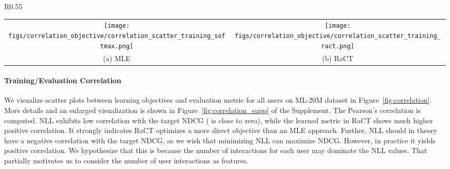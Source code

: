 \documentclass{article} \usepackage{iclr2020_conference,times}
\begin{document}
\begin{wrapfigure}{R}{0.55\textwidth}
\vspace{-0mm}
	\centering
	\begin{tabular}{c c}
		\hspace{-4mm}
		\texttt{[image: figs/correlation\_objective/correlation\_scatter\_training\_softmax.png]} &
		\hspace{-7mm}
		\texttt{[image: figs/correlation\_objective/correlation\_scatter\_training\_ract.png]}
		\\
		(a) MLE\vspace{-0mm}   & 
		(b) RaCT \hspace{-0mm} \\ 	
	\end{tabular}
	\vspace{-2mm}
	\caption{Correlation between the learning objectives (MLE or RaCT) and evaluation metrics on training.}
\vspace{-2mm}
	\label{fig:correlation}
\end{wrapfigure}

\paragraph{Training/Evaluation Correlation} We visualize scatter plots between learning objectives and evaluation metric for all users on ML-20M dataset in Figure~\ref{fig:correlation}. More details and an enlarged visualization is shown in Figure~\ref{fig:correlation_supp} of the Supplement.
The Pearson's correlation  is computed. NLL exhibits low correlation with the target NDCG ( is close to zero), while the learned metric in RaCT shows much higher positive correlation. It strongly indicates RaCT optimizes a more direct objective than an MLE approach. Further, NLL should in theory have a negative correlation with the target NDCG, as we wish that minimizing NLL can maximize NDCG. However, in practice it yields positive correlation. We hypothesize that this is because the number of interactions for each user may dominate the NLL values. That partially motivates us to consider the number of user interactions as features.
\end{document}
